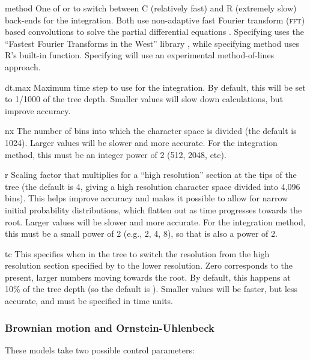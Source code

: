 \documentclass[12pt,twoside]{article}
\newenvironment{cdescription}{\begin{description}[font=\tt,leftmargin=4em,labelindent=2em,noitemsep]\addtolength{\parskip}{.75ex}}{\end{description}}
\begin{document}
\begin{cdescription}
\item[method] One of  or  to switch between
  C (relatively fast) and R (extremely slow) back-ends for the
  integration.
  Both use non-adaptive fast Fourier transform (\textsc{fft}) based
  convolutions to solve the partial differential equations
  \citep[see][]{FitzJohn-2010-619}.
  Specifying  uses the ``Fastest Fourier Transforms in
  the West'' library \citep{fftw}, while specifying 
  method uses R's built-in  function.
  Specifying  will use an experimental method-of-lines
  approach.
  
\item[dt.max] Maximum time step to use for the integration.  By
  default, this will be set to 1/1000 of the tree depth.  Smaller
  values will slow down calculations, but improve accuracy.

\item[nx] The number of bins into which the character space is divided
  (the default is 1024).  Larger values will be slower and more
  accurate.  For the  integration method, this must be an
  integer power of 2 (512, 2048, etc).

\item[r] Scaling factor that multiplies  for a ``high
  resolution'' section at the tips of the tree (the default is 4,
  giving a high resolution character space divided into 4,096 bins).
  This helps improve accuracy and makes it possible to allow for
  narrow initial probability distributions, which flatten out as time
  progresses towards the root.  Larger values will be slower and more
  accurate.  For the  integration method, this must be a
  small power of 2 (e.g., 2, 4, 8), so that  is also a
  power of 2.
  
\item[tc] This specifies when in the tree to switch the resolution
  from the high resolution section specified by  to the lower
  resolution. Zero corresponds to the present, larger numbers moving
  towards the root.  By default, this happens at 10\% of the tree
  depth (so the default is ).
  Smaller values will be faster, but less accurate, and must be
  specified in time units.
\end{cdescription}

\subsubsection{Brownian motion and Ornstein-Uhlenbeck}
These models take two possible control parameters:
\end{document}
